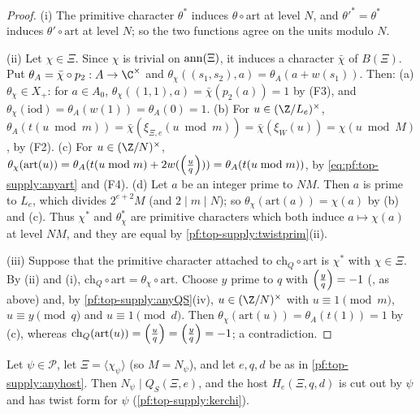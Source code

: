 \begin{proof}
(i) The primitive character $\theta^*$ induces $\theta\circ\mathrm{art}$ at level $N$, and $\theta'^*=\theta^*$ induces
$\theta'\circ\mathrm{art}$ at level $N$; so the two functions agree on the units modulo $N$.

(ii) Let $\chi\in\Xi$. Since $\chi$ is trivial on $\operatorname{ann}(\Xi)$, it induces a character $\bar\chi$ of $B(\Xi)$. Put
$\theta_A=\bar\chi\circ p_2:A\to\C^\times$ and $\theta_\chi((s_1,s_2),a)=\theta_A(a+w(s_1))$. Then:
(a) $\theta_\chi\in X_+$: for $a\in A_0$, $\theta_\chi((1,1),a)=\bar\chi(p_2(a))=1$ by (F3), and
$\theta_\chi(\mathrm{iod})=\theta_A(w(1))=\theta_A(0)=1$.
(b) For $u\in(\Z/L_e)^\times$, $\theta_A(t(u\bmod m))=\bar\chi(\xi_{\Xi,e}(u\bmod m))=\bar\chi(\xi_W(u))=\chi(u\bmod M)$, by (F2).
(c) For $u\in(\Z/N)^\times$, $\theta_\chi(\mathrm{art}(u))=\theta_A(t(u\bmod m)+2w(\left(\frac{u}{q}\right)))=\theta_A(t(u\bmod m))$, by
\eqref{eq:pf:top-supply:anyart} and (F4).
(d) Let $a$ be an integer prime to $NM$. Then $a$ is prime to $L_e$, which divides $2^{e+2}M$ (and $2\mid m\mid N$); so
$\theta_\chi(\mathrm{art}(a))=\chi(a)$ by (b) and (c). Thus $\chi^*$ and $\theta_\chi^*$ are primitive characters which both
induce $a\mapsto\chi(a)$ at level $NM$, and they are equal by \cref{pf:top-supply:twistprim}(ii).

(iii) Suppose that the primitive character attached to $\mathrm{ch}_Q\circ\mathrm{art}$ is $\chi^*$ with $\chi\in\Xi$. By (ii)
and (i), $\mathrm{ch}_Q\circ\mathrm{art}=\theta_\chi\circ\mathrm{art}$. Choose $y$ prime to $q$ with $\left(\frac{y}{q}\right)=-1$
(, as above) and, by \cref{pf:top-supply:anyQS}(iv), $u\in(\Z/N)^\times$ with
$u\equiv1\pmod m$, $u\equiv y\pmod q$ and $u\equiv1\pmod d$. Then $\theta_\chi(\mathrm{art}(u))=\theta_A(t(1))=1$ by (c),
whereas $\mathrm{ch}_Q(\mathrm{art}(u))=\left(\frac{u}{q}\right)=\left(\frac{y}{q}\right)=-1$; a contradiction.
\end{proof}

\begin{lemma}\label{pf:top-supply:anytwist}
Let $\psi\in\mathcal P$, let $\Xi=\langle\chi_\psi\rangle$ (so $M=N_\psi$), and let $e,q,d$ be as in
\cref{pf:top-supply:anyhost}. Then $N_\psi\mid Q_S(\Xi,e)$, and the host $H_e(\Xi,q,d)$ is cut out by $\psi$ and has twist
form for $\psi$ (\cref{pf:top-supply:kerchi}).
 
\end{lemma}

